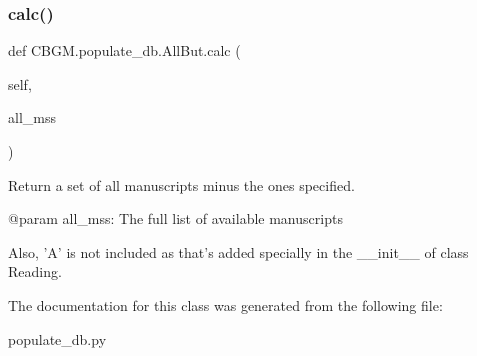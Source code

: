 \subsubsection{\texorpdfstring{calc()}{calc()}}
{\footnotesize\ttfamily def C\+B\+G\+M.\+populate\+\_\+db.\+All\+But.\+calc (\begin{DoxyParamCaption}\item[{}]{self,  }\item[{}]{all\+\_\+mss }\end{DoxyParamCaption})}

\begin{DoxyVerb}Return a set of all manuscripts minus the ones specified.

@param all_mss: The full list of available manuscripts

Also, 'A' is not included as that's added specially in the __init__ of
class Reading.
\end{DoxyVerb}
 

The documentation for this class was generated from the following file\+:\begin{DoxyCompactItemize}
\item 
populate\+\_\+db.\+py\end{DoxyCompactItemize}
